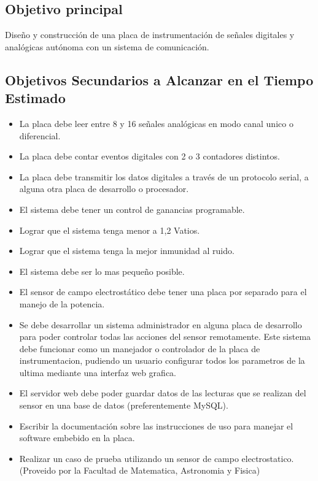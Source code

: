 \subsection{Objetivo principal} %
\label{sec:objetivo_principal}

Diseño y construcción de una placa de instrumentación de señales digitales y analógicas autónoma con un sistema de comunicación.


\subsection{Objetivos Secundarios a Alcanzar en el Tiempo Estimado} %
\label{sec: objetivos_secundarios}

\begin{itemize}
	\item La placa debe leer entre 8 y 16 señales analógicas en modo canal unico o diferencial.
    \item La placa debe contar eventos digitales con 2 o 3 contadores distintos.
    \item La placa debe transmitir los datos digitales a través de un protocolo serial, a alguna otra placa de desarrollo o procesador.
    \item El sistema debe tener un control de ganancias programable.
    \item Lograr que el sistema tenga menor a 1,2 Vatios.
    \item Lograr que el sistema tenga la mejor inmunidad al ruido.
    \item El sistema debe ser lo mas pequeño posible.
    \item El sensor de campo electrostático debe tener una placa por separado para el manejo de la potencia.
    \item Se debe desarrollar un sistema administrador en alguna placa de desarrollo para poder controlar todas las acciones del sensor remotamente. Este sistema debe funcionar como un manejador o controlador de la placa de instrumentacion, pudiendo un usuario configurar todos los parametros de la ultima mediante una interfaz web grafica.
    \item El servidor web debe poder guardar datos de las lecturas que se realizan del sensor en una base de datos (preferentemente MySQL).
    \item Escribir la documentación sobre las instrucciones de uso para manejar el software embebido en la placa.
    \item Realizar un caso de prueba utilizando un sensor de campo electrostatico. (Proveido por la Facultad de Matematica, Astronomia y Fisica)
\end{itemize}


